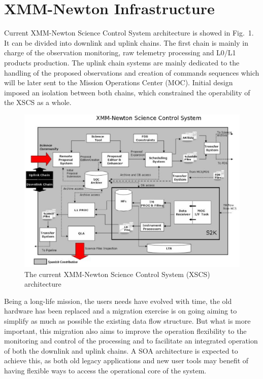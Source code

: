 \documentclass[11pt,twoside]{article}
\begin{document}
\section{XMM-Newton Infrastructure}
Current XMM-Newton Science Control System architecture is showed in Fig.~1. It can be divided into 
downlink and uplink chains. The first chain is mainly in charge of the observation monitoring, raw telemetry processing and L0/L1 products production. \cite{vallejo11}
The uplink chain systems are mainly dedicated to the handling of the proposed observations and creation of
commands sequences which will be later sent to the Mission Operations Center (MOC).
Initial design imposed an isolation between both chains, which constrained the operability of the XSCS as a whole. 
\begin{figure}[h]
\centering
\includegraphics[width=80 mm]{P022_f1.eps}
\caption{The current XMM-Newton Science Control System (XSCS) architecture}
\label{fig:1}
\end{figure}
Being a long-life mission, the users needs have evolved with time, 
the old hardware has been replaced and a migration exercise is on going aiming
to simplify as much as possible the existing data flow structure. But what is more important,
this migration also aims to improve the operation flexibility to the monitoring and control of the processing
and to facilitate an integrated operation of both the downlink and uplink chains. A SOA architecture
is expected to achieve this, as both old legacy applications and new user tools may benefit of
having flexible ways to access the operational core of the system.
\end{document}
